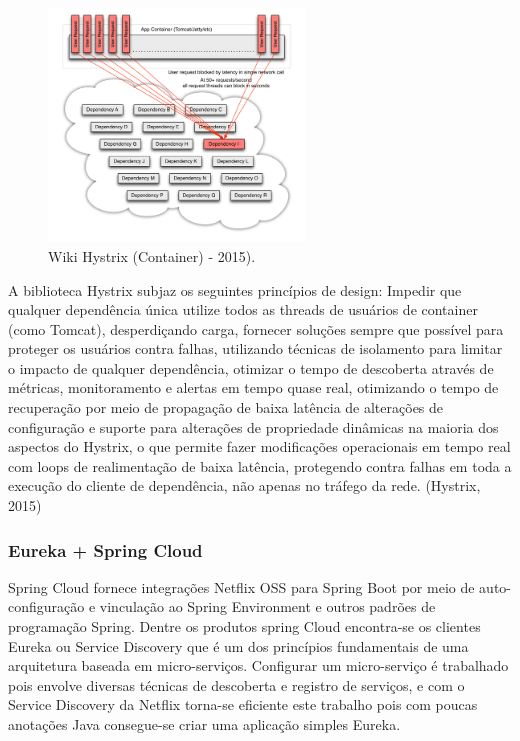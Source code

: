 \begin{figure}[h]
\centering
\includegraphics[height=6.2cm]{imagens/figura5}
\caption{Wiki Hystrix (Container) - 2015).}
\label{fig:hystrix-container}
\end{figure}

A biblioteca Hystrix subjaz os seguintes princípios de design: Impedir que qualquer dependência única utilize todos as threads de usuários de container (como Tomcat), desperdiçando carga, fornecer soluções sempre que possível para proteger os usuários contra falhas, utilizando técnicas de isolamento para limitar o impacto de qualquer dependência, otimizar o tempo de descoberta através de métricas, monitoramento e alertas em tempo quase real, otimizando o tempo de recuperação por meio de propagação de baixa latência de alterações de configuração e suporte para alterações de propriedade dinâmicas na maioria dos aspectos do Hystrix, o que permite fazer modificações operacionais em tempo real com loops de realimentação de baixa latência, protegendo contra falhas em toda a execução do cliente de dependência, não apenas no tráfego da rede. (Hystrix, 2015)

\subsubsection{Eureka + Spring Cloud}
Spring Cloud fornece integrações Netflix OSS para Spring Boot por meio de auto-configuração e vinculação ao Spring Environment e outros padrões de programação Spring. Dentre os produtos spring Cloud encontra-se os clientes Eureka ou Service Discovery que é um dos princípios fundamentais de uma arquitetura baseada em micro-serviços. Configurar um micro-serviço é trabalhado pois envolve diversas técnicas de descoberta e registro de serviços, e com o Service Discovery da Netflix torna-se eficiente este trabalho pois com poucas anotações Java consegue-se criar uma aplicação simples Eureka. 


